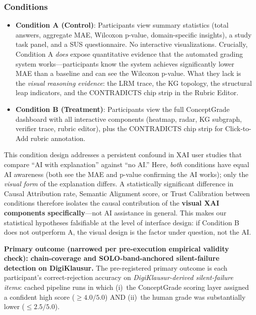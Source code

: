 \documentclass[journal,review]{vgtc}
\begin{document}
\subsubsection{Conditions}

\begin{itemize}
  \item \textbf{Condition A (Control)}: Participants view summary statistics (total answers, aggregate MAE, Wilcoxon p-value, domain-specific insights), a study task panel, and a SUS questionnaire. No interactive visualizations. Crucially, Condition A \textit{does} expose quantitative evidence that the automated grading system works---participants know the system achieves significantly lower MAE than a baseline and can see the Wilcoxon p-value. What they lack is the \textit{visual reasoning evidence}: the LRM trace, the KG topology, the structural leap indicators, and the CONTRADICTS chip strip in the Rubric Editor.

  \item \textbf{Condition B (Treatment)}: Participants view the full ConceptGrade dashboard with all interactive components (heatmap, radar, KG subgraph, verifier trace, rubric editor), plus the CONTRADICTS chip strip for Click-to-Add rubric annotation.
\end{itemize}

This condition design addresses a persistent confound in XAI user studies that compare ``AI with explanation'' against ``no AI.'' Here, \textit{both} conditions have equal AI awareness (both see the MAE and p-value confirming the AI works); only the \textit{visual form} of the explanation differs. A statistically significant difference in Causal Attribution rate, Semantic Alignment score, or Trust Calibration between conditions therefore isolates the causal contribution of the \textbf{visual XAI components specifically}---not AI assistance in general. This makes our statistical hypotheses falsifiable at the level of interface design: if Condition B does not outperform A, the visual design is the factor under question, not the AI.

\textbf{Primary outcome (narrowed per pre-execution empirical validity
check): chain-coverage and SOLO-band-anchored silent-failure detection
on DigiKlausur.} The pre-registered primary outcome is each
participant's correct-rejection accuracy on
\emph{DigiKlausur-derived silent-failure items}: cached pipeline runs
in which (i)~the ConceptGrade scoring layer assigned a confident high
score ($\geq 4.0/5.0$) AND (ii)~the human grade was substantially lower
($\leq 2.5/5.0$).
\end{document}
